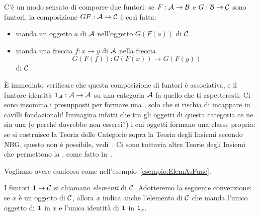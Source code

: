 \begin{costruzione}
C'è un modo sensato di comporre due funtori: se \(F : \mathcal A \to \mathcal B\) e \(G : \mathcal B \to \mathcal C\) sono funtori, la composizione \(GF : \mathcal A \to \mathcal C\) è così fatta:
%
\begin{itemize}
\item manda un oggetto \(a\) di \(\mathcal A\) nell'oggetto \(G(F(a))\) di \(\mathcal C\)
\item manda una freccia \(f : x \to y\) di \(\mathcal A\) nella freccia
\[G(F(f)) : G(F(x)) \to G(F(y))\]
di \(\mathcal C\).
\end{itemize}
%
È immediato verificare che questa composizione di funtori è associativa, e il funtore identità \(\mathtt{1}_\mathcal A : \mathcal A \to \mathcal A\) su una categoria \(\mathcal A\) fa quello che ti aspetteresti. Ci sono insomma i presupposti per formare una , solo che si rischia di incappare in cavilli fondazionali! Immagina infatti che tra gli oggetti di questa categoria ce ne sia una (e perché dovrebbe non esserci?) i cui oggetti formano una classe propria: se si costruisce la Teoria delle Categorie sopra la Teoria degli Insiemi secondo NBG, questo non è possibile, vedi~\cite{berarducci:insiemi}. Ci sono tuttavia altre Teorie degli Insiemi che permettono la , come fatto in~\cite{adamek-herrlich-strecker:cats}.
\end{costruzione}

Vogliamo avere qualcosa come nell'esempio~\ref{esempio:ElemAsFunc}.

\begin{definizione}\label{definizione:CatElem}
I funtori \(\mathbf{1} \to \mathcal C\) si chiamano {\em elementi} di \(\mathcal C\). Adotteremo la seguente convenzione: se \(x\) è un oggetto di \(\mathcal C\), allora \(x\) indica anche l'elemento di \(\mathcal C\) che manda l'unico oggetto di \(\mathbf{1}\) in \(x\) e l'unica identità di \(\mathbf{1}\) in \(\mathtt{1}_x\). 
\end{definizione}
